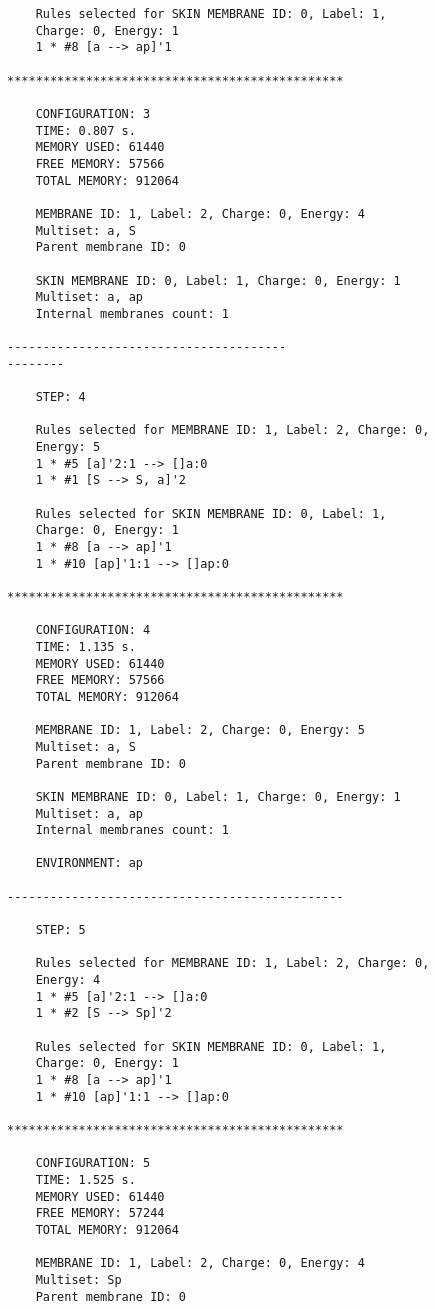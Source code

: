 \documentclass{acm_proc_article-sp}
\begin{document}
\begin{lstlisting}
    Rules selected for SKIN MEMBRANE ID: 0, Label: 1, 
    Charge: 0, Energy: 1
    1 * #8 [a --> ap]'1

***********************************************

    CONFIGURATION: 3
    TIME: 0.807 s.
    MEMORY USED: 61440
    FREE MEMORY: 57566
    TOTAL MEMORY: 912064

    MEMBRANE ID: 1, Label: 2, Charge: 0, Energy: 4
    Multiset: a, S
    Parent membrane ID: 0

    SKIN MEMBRANE ID: 0, Label: 1, Charge: 0, Energy: 1
    Multiset: a, ap
    Internal membranes count: 1

---------------------------------------
--------

    STEP: 4

    Rules selected for MEMBRANE ID: 1, Label: 2, Charge: 0, 
    Energy: 5
    1 * #5 [a]'2:1 --> []a:0
    1 * #1 [S --> S, a]'2

    Rules selected for SKIN MEMBRANE ID: 0, Label: 1, 
    Charge: 0, Energy: 1
    1 * #8 [a --> ap]'1
    1 * #10 [ap]'1:1 --> []ap:0

***********************************************

    CONFIGURATION: 4
    TIME: 1.135 s.
    MEMORY USED: 61440
    FREE MEMORY: 57566
    TOTAL MEMORY: 912064

    MEMBRANE ID: 1, Label: 2, Charge: 0, Energy: 5
    Multiset: a, S
    Parent membrane ID: 0

    SKIN MEMBRANE ID: 0, Label: 1, Charge: 0, Energy: 1
    Multiset: a, ap
    Internal membranes count: 1

    ENVIRONMENT: ap

-----------------------------------------------

    STEP: 5

    Rules selected for MEMBRANE ID: 1, Label: 2, Charge: 0, 
    Energy: 4
    1 * #5 [a]'2:1 --> []a:0
    1 * #2 [S --> Sp]'2

    Rules selected for SKIN MEMBRANE ID: 0, Label: 1, 
    Charge: 0, Energy: 1
    1 * #8 [a --> ap]'1
    1 * #10 [ap]'1:1 --> []ap:0

***********************************************

    CONFIGURATION: 5
    TIME: 1.525 s.
    MEMORY USED: 61440
    FREE MEMORY: 57244
    TOTAL MEMORY: 912064

    MEMBRANE ID: 1, Label: 2, Charge: 0, Energy: 4
    Multiset: Sp
    Parent membrane ID: 0


\end{lstlisting}
\end{document}
